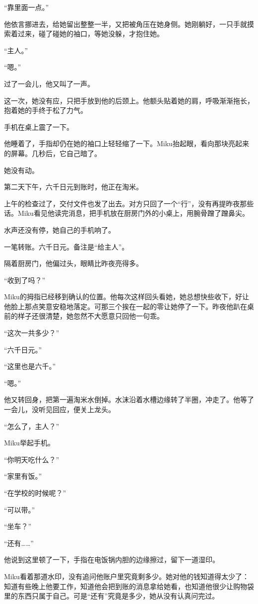 “靠里面一点。”

他依言挪进去，给她留出整整一半，又把被角压在她身侧。她刚躺好，一只手就摸索着过来，碰了碰她的袖口，等她没躲，才抱住她。

“主人。”

“嗯。”

过了一会儿，他又叫了一声。

这一次，她没有应，只把手放到他的后颈上。他额头贴着她的肩，呼吸渐渐拖长，抱着她的手终于松了力气。

手机在桌上震了一下。

他睡着了，手指却仍在她的袖口上轻轻缩了一下。Miku抬起眼，看向那块亮起来的屏幕。几秒后，它自己暗了。

她没有动。

\SceneBreak

第二天下午，六千日元到账时，他正在淘米。

上午的检查过了，交付文件也发了出去。对方只回了一个“行”，没有再提昨夜那些话。Miku看见他读完消息，把手机放在厨房门外的小桌上，用腕骨蹭了蹭鼻尖。

水声还没有停，她自己的手机响了。

一笔转账。六千日元。备注是“给主人”。

隔着厨房门，他偏过头，眼睛比昨夜亮得多。

“收到了吗？”

Miku的拇指已经移到确认的位置。他每次这样回头看她，她总想快些收下，好让他脸上那点笑意安稳地落定。可那三个挨在一起的零让她停了一下。昨夜他趴在桌前的样子还很清楚，她忽然不大愿意只回他一句乖。

“这次一共多少？”

“六千日元。”

“这里也是六千。”

“嗯。”

他又转回身，把第一遍淘米水倒掉。水沫沿着水槽边缘转了半圈，冲走了。他等了一会儿，没听见回应，便关上龙头。

“怎么了，主人？”

Miku举起手机。

“你明天吃什么？”

“家里有饭。”

“在学校的时候呢？”

“可以带。”

“坐车？”

“还有……”

他说到这里顿了一下，手指在电饭锅内胆的边缘擦过，留下一道湿印。

Miku看着那道水印，没有追问他账户里究竟剩多少。她对他的钱知道得太少了：知道有些晚上他要工作，知道他会把到账的消息拿给她看，也知道他很少让购物袋里的东西只属于自己。可是“还有”究竟是多少，她从没有认真问完过。

